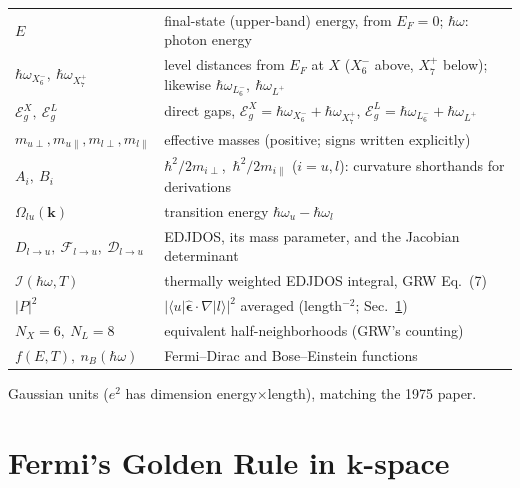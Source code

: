 \documentclass[11pt,a4paper]{article}
\numberwithin{equation}{section}
\newcommand{\hw}{\hbar\omega}
\newcommand{\EgX}{\mathcal{E}_g^{X}}
\newcommand{\EgL}{\mathcal{E}_g^{L}}
\newcommand{\cD}{\mathcal{D}}
\newcommand{\cF}{\mathcal{F}}
\newcommand{\cI}{\mathcal{I}}
\newcommand{\wXsix}{\hbar\omega_{X_6^-}}
\newcommand{\wXseven}{\hbar\omega_{X_7^+}}
\newcommand{\wLsix}{\hbar\omega_{L_6^-}}
\newcommand{\wLplus}{\hbar\omega_{L^+}}
\begin{document}
\begin{center}
\small
\begin{tabular}{ll}
\toprule
$E$ & final-state (upper-band) energy, from $E_F=0$; $\hw$: photon energy\\
$\wXsix,\ \wXseven$ & level distances from $E_F$ at $X$
  ($X_6^-$ above, $X_7^+$ below); likewise $\wLsix,\ \wLplus$\\
$\EgX,\ \EgL$ & direct gaps, $\EgX=\wXsix+\wXseven$,
  $\EgL=\wLsix+\wLplus$\\
$m_{u\perp},m_{u\parallel},m_{l\perp},m_{l\parallel}$ &
  effective masses (positive; signs written explicitly)\\
$A_i,\ B_i$ & $\hbar^2/2m_{i\perp}$,\ $\hbar^2/2m_{i\parallel}$
  ($i=u,l$): curvature shorthands for derivations\\
$\Omega_{lu}(\mathbf k)$ & transition energy
  $\hbar\omega_u-\hbar\omega_l$\\
$D_{l\to u},\ \cF_{l\to u},\ \cD_{l\to u}$ & EDJDOS, its mass
  parameter, and the Jacobian determinant\\
$\cI(\hw,T)$ & thermally weighted EDJDOS integral, GRW Eq.~(7)\\
$|P|^2$ & $|\langle u|\hat{\bm\epsilon}\!\cdot\!\nabla|l\rangle|^2$
  averaged (length$^{-2}$; Sec.~\ref{sec:fgr})\\
$N_X=6,\ N_L=8$ & equivalent half-neighborhoods (GRW's counting)\\
$f(E,T),\ n_B(\hw)$ & Fermi--Dirac and Bose--Einstein functions\\
\bottomrule
\end{tabular}
\end{center}

\noindent Gaussian units ($e^2$ has dimension energy$\times$length),
matching the 1975 paper.

\section{Fermi's Golden Rule in $\mathbf k$-space}\label{sec:fgr}
\end{document}
